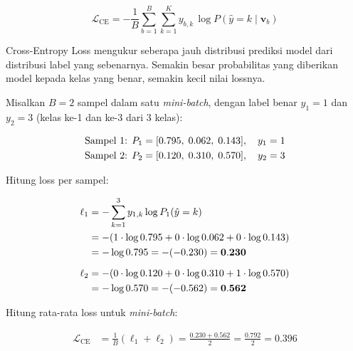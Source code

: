 \vspace{0.5cm}
\begin{equation}
  \mathcal{L}_{\mathrm{CE}}
  = -\frac{1}{B}\sum_{b=1}^{B}\sum_{k=1}^{K}
    y_{b,k}\,\log P(\hat{y}=k\mid\mathbf{v}_b)
\end{equation}
\vspace{0.5cm}
 
\noindent
Cross-Entropy Loss mengukur seberapa jauh distribusi prediksi model
dari distribusi label yang sebenarnya. Semakin besar probabilitas
yang diberikan model kepada kelas yang benar, semakin kecil nilai
lossnya.
 
Misalkan $B=2$ sampel dalam satu \textit{mini-batch}, dengan label
benar $y_1 = 1$ dan $y_2 = 3$ (kelas ke-1 dan ke-3 dari 3 kelas):
 
\vspace{0.5cm}
\begin{align*}
  \text{Sampel 1: } P_1 &= [0.795,\; 0.062,\; 0.143],\quad y_1=1 \notag \\
  \text{Sampel 2: } P_2 &= [0.120,\; 0.310,\; 0.570],\quad y_2=3
\end{align*}
\vspace{0.5cm}
 
\noindent Hitung loss per sampel:
 
\vspace{0.5cm}
\begin{align*}
  \ell_1
  &= -\sum_{k=1}^{3} y_{1,k} \log P_1(\hat{y}=k) \notag \\
  &= -(1 \cdot \log 0.795 + 0 \cdot \log 0.062 + 0 \cdot \log 0.143) \notag \\
  &= -\log 0.795
   = -(-0.230)
   = \mathbf{0.230} \\[6pt]
  \ell_2
  &= -(0 \cdot \log 0.120 + 0 \cdot \log 0.310 + 1 \cdot \log 0.570) \notag \\
  &= -\log 0.570
   = -(-0.562)
   = \mathbf{0.562}
\end{align*}
\vspace{0.5cm}
 
\noindent Hitung rata-rata loss untuk \textit{mini-batch}:
 
\vspace{0.5cm}
\begin{align*}
  \mathcal{L}_{\mathrm{CE}}
  &= \frac{1}{B}(\ell_1 + \ell_2)
   = \frac{0.230 + 0.562}{2}
   = \frac{0.792}{2}
   = \mathbf{0.396}
\end{align*}
\vspace{0.5cm}
 
